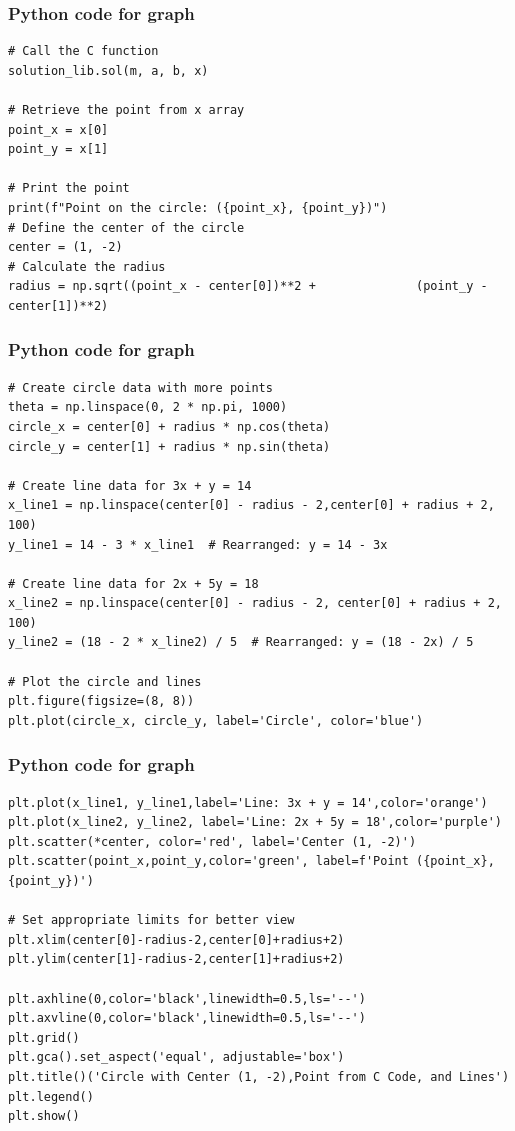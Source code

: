 \documentclass{beamer}
\begin{document}
\begin{frame}
    \scriptsize
    \frametitle{Python code for graph}
    \begin{verbatim}
# Call the C function
solution_lib.sol(m, a, b, x)

# Retrieve the point from x array
point_x = x[0]
point_y = x[1]

# Print the point
print(f"Point on the circle: ({point_x}, {point_y})")
# Define the center of the circle
center = (1, -2)
# Calculate the radius
radius = np.sqrt((point_x - center[0])**2 +              (point_y - center[1])**2)
 \end{verbatim}
\end{frame}
\begin{frame}
    \scriptsize
    \frametitle{Python code for graph}
    \begin{verbatim}
# Create circle data with more points
theta = np.linspace(0, 2 * np.pi, 1000) 
circle_x = center[0] + radius * np.cos(theta)
circle_y = center[1] + radius * np.sin(theta)

# Create line data for 3x + y = 14
x_line1 = np.linspace(center[0] - radius - 2,center[0] + radius + 2, 100)
y_line1 = 14 - 3 * x_line1  # Rearranged: y = 14 - 3x

# Create line data for 2x + 5y = 18
x_line2 = np.linspace(center[0] - radius - 2, center[0] + radius + 2, 100)
y_line2 = (18 - 2 * x_line2) / 5  # Rearranged: y = (18 - 2x) / 5

# Plot the circle and lines
plt.figure(figsize=(8, 8))
plt.plot(circle_x, circle_y, label='Circle', color='blue')
\end{verbatim}
\end{frame}
\begin{frame}
    \scriptsize
    \frametitle{Python code for graph}
\begin{verbatim}
plt.plot(x_line1, y_line1,label='Line: 3x + y = 14',color='orange')
plt.plot(x_line2, y_line2, label='Line: 2x + 5y = 18',color='purple')
plt.scatter(*center, color='red', label='Center (1, -2)')
plt.scatter(point_x,point_y,color='green', label=f'Point ({point_x}, {point_y})')

# Set appropriate limits for better view
plt.xlim(center[0]-radius-2,center[0]+radius+2)
plt.ylim(center[1]-radius-2,center[1]+radius+2)

plt.axhline(0,color='black',linewidth=0.5,ls='--')
plt.axvline(0,color='black',linewidth=0.5,ls='--')
plt.grid()
plt.gca().set_aspect('equal', adjustable='box') 
plt.title()('Circle with Center (1, -2),Point from C Code, and Lines')
plt.legend()
plt.show()
\end{verbatim}
\end{frame}
\end{document}
